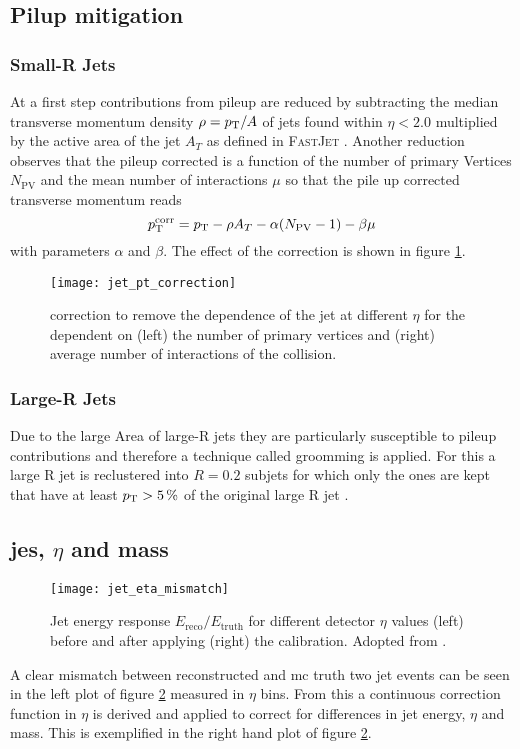\subsection{Pilup mitigation}
\subsubsection*{Small-R Jets}
At a first step contributions from pileup are reduced by subtracting the median transverse momentum density $\rho=p_{\text{T}} / A$ of jets found within $\eta<2.0$ multiplied by the active area of the jet $A_T$ as defined in \textsc{FastJet} \citep{cacciari2012fastjet}. Another reduction observes that the pileup corrected \pt is a function of the number of primary Vertices $N_\text{PV}$ and the mean number of interactions $\mu$ so that the pile up corrected transverse momentum reads
\begin{equation}
  p_{\text{T}}^\text{corr}=p_{\text{T}}-\rho A_T -\alpha(N_\text{PV}-1)-\beta\mu
\end{equation}
with parameters $\alpha$ and $\beta$. The effect of the correction is shown in figure \ref{fig:jet_pt_correction}.
\begin{figure}
  \centering
  \texttt{[image: jet\_pt\_correction]}
  \caption[]{\pt correction to remove the \pt dependence of the jet at different $\eta$ for the \pt dependent on (left) the number of primary vertices and (right) average number of interactions of the collision.}
  \label{fig:jet_pt_correction}
\end{figure}
\subsubsection*{Large-R Jets}
Due to the large Area of large-R jets they are particularly susceptible to pileup contributions and therefore a technique called groomming is applied. For this a large R jet is reclustered into $R=0.2$ subjets for which only the ones are kept that have at least $p_{\text{T}}>\qty[]{5}{\percent}$ of the original large R jet \pt.

\subsection{\ac{jes}, $\eta$ and mass}
\begin{figure}
  \centering
  \texttt{[image: jet\_eta\_mismatch]}
  \caption[]{Jet energy response $E_\text{reco}/E_\text{truth}$ for different detector $\eta$ values (left) before and after applying (right) the calibration. Adopted from \citep{jet_eta_calib}.}
  \label{fig:jet_eta_mismatch}
\end{figure}
A clear mismatch between reconstructed and \ac{mc} truth two jet events can be seen in the left plot of figure \ref{fig:jet_eta_mismatch} measured in $\eta$ bins. From this a continuous correction function in $\eta$ is derived and applied to correct for differences in jet energy, $\eta$ and mass. This is exemplified in the right hand plot of figure \ref{fig:jet_eta_mismatch}.

